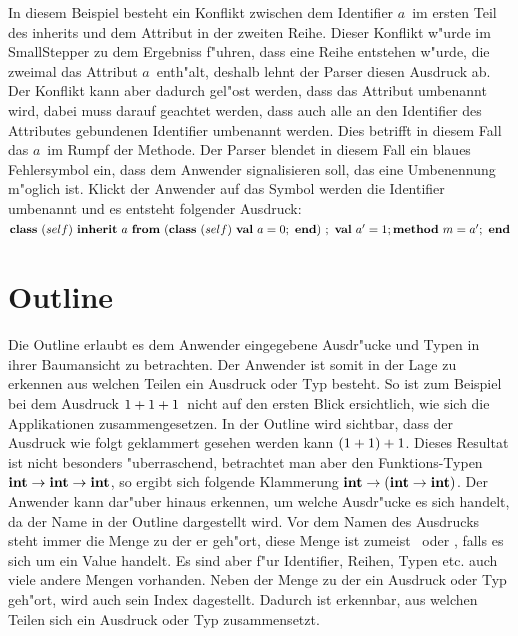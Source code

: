 In diesem Beispiel besteht ein Konflikt zwischen dem Identifier \glqq$a$\grqq\ 
im ersten Teil des inherits und dem Attribut in der zweiten Reihe. Dieser 
Konflikt w"urde im SmallStepper zu dem Ergebniss f"uhren, dass eine Reihe
entstehen w"urde, die zweimal das Attribut \glqq$a$\grqq\ enth"alt, deshalb
lehnt der Parser diesen Ausdruck ab. Der Konflikt kann aber dadurch gel"ost
werden, dass das Attribut umbenannt wird, dabei muss darauf geachtet werden,
dass auch alle an den Identifier des Attributes gebundenen Identifier umbenannt
werden. Dies betrifft in diesem Fall das \glqq$a$\grqq\ im Rumpf der Methode.
Der Parser blendet in diesem Fall ein blaues Fehlersymbol ein, dass dem Anwender
signalisieren soll, das eine Umbenennung m"oglich ist. Klickt der Anwender auf
das Symbol werden die Identifier umbenannt und es entsteht folgender Ausdruck:\\[2mm]
\glqq$\class{self}{\inherit{a}{(\class{self}{\val{a}{0}})}{\val{a'}{1} \method{m}{a'}}}$\grqq


\section {Outline}
\label{Outline}
Die Outline erlaubt es dem Anwender eingegebene Ausdr"ucke und Typen
in ihrer Baumansicht zu betrachten. Der Anwender ist somit in der Lage
zu erkennen aus welchen Teilen ein Ausdruck oder Typ besteht. So ist zum
Beispiel bei dem Ausdruck \glqq$\infix{+}{\infix{+}{1}{1}}{1}$\grqq\ nicht 
auf den ersten Blick ersichtlich, wie sich die Applikationen zusammengesetzen. 
In der Outline wird sichtbar, dass der Ausdruck wie folgt geklammert gesehen
werden kann \glqq$\infix{+}{(\infix{+}{1}{1})}{1}$\grqq. Dieses Resultat ist nicht
besonders "uberraschend, betrachtet man aber den Funktions-Typen
\glqq$\arrowtype{\inttype}{\arrowtype{\inttype}{\inttype}}$\grqq, so ergibt sich
folgende Klammerung \glqq$\arrowtype{\inttype}{(\arrowtype{\inttype}{\inttype})}$\grqq.
Der Anwender kann dar"uber hinaus erkennen, um welche Ausdr"ucke es sich
handelt, da der Name in der Outline dargestellt wird. Vor dem Namen des
Ausdrucks steht immer die Menge zu der er geh"ort, diese Menge ist zumeist
\glqq{\bf e}\grqq\ oder \glqq{\bf v}\grqq, falls es sich um ein Value handelt.
Es sind aber f"ur Identifier, Reihen, Typen etc. auch viele andere Mengen
vorhanden. Neben der Menge zu der ein Ausdruck oder Typ geh"ort, wird auch
sein Index dagestellt. Dadurch ist erkennbar, aus welchen Teilen sich ein
Ausdruck oder Typ zusammensetzt.

